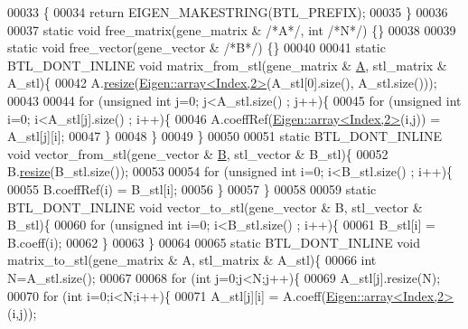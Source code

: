 \begin{DoxyCode}
00033   \{
00034     \textcolor{keywordflow}{return} EIGEN\_MAKESTRING(BTL\_PREFIX);
00035   \}
00036 
00037   \textcolor{keyword}{static} \textcolor{keywordtype}{void} free\_matrix(gene\_matrix & \textcolor{comment}{/*A*/}, \textcolor{keywordtype}{int} \textcolor{comment}{/*N*/}) \{\}
00038 
00039   \textcolor{keyword}{static} \textcolor{keywordtype}{void} free\_vector(gene\_vector & \textcolor{comment}{/*B*/}) \{\}
00040 
00041   \textcolor{keyword}{static} BTL\_DONT\_INLINE \textcolor{keywordtype}{void} matrix\_from\_stl(gene\_matrix & \hyperlink{group___core___module_class_eigen_1_1_matrix}{A}, stl\_matrix & A\_stl)\{
00042     A.\hyperlink{class_eigen_1_1_tensor_a5ab1ec6dc9b05d5e4db3600bc9d2cc6b}{resize}(\hyperlink{class_eigen_1_1array}{Eigen::array<Index,2>}(A\_stl[0].size(), A\_stl.size()));
00043 
00044     \textcolor{keywordflow}{for} (\textcolor{keywordtype}{unsigned} \textcolor{keywordtype}{int} j=0; j<A\_stl.size() ; j++)\{
00045       \textcolor{keywordflow}{for} (\textcolor{keywordtype}{unsigned} \textcolor{keywordtype}{int} i=0; i<A\_stl[j].size() ; i++)\{
00046         A.coeffRef(\hyperlink{class_eigen_1_1array}{Eigen::array<Index,2>}(i,j)) = A\_stl[j][i];
00047       \}
00048     \}
00049   \}
00050 
00051   \textcolor{keyword}{static} BTL\_DONT\_INLINE  \textcolor{keywordtype}{void} vector\_from\_stl(gene\_vector & \hyperlink{group___core___module_class_eigen_1_1_matrix}{B}, stl\_vector & B\_stl)\{
00052     B.\hyperlink{class_eigen_1_1_tensor_a5ab1ec6dc9b05d5e4db3600bc9d2cc6b}{resize}(B\_stl.size());
00053 
00054     \textcolor{keywordflow}{for} (\textcolor{keywordtype}{unsigned} \textcolor{keywordtype}{int} i=0; i<B\_stl.size() ; i++)\{
00055       B.coeffRef(i) = B\_stl[i];
00056     \}
00057   \}
00058 
00059   \textcolor{keyword}{static} BTL\_DONT\_INLINE  \textcolor{keywordtype}{void} vector\_to\_stl(gene\_vector & B, stl\_vector & B\_stl)\{
00060     \textcolor{keywordflow}{for} (\textcolor{keywordtype}{unsigned} \textcolor{keywordtype}{int} i=0; i<B\_stl.size() ; i++)\{
00061       B\_stl[i] = B.coeff(i);
00062     \}
00063   \}
00064 
00065   \textcolor{keyword}{static} BTL\_DONT\_INLINE  \textcolor{keywordtype}{void} matrix\_to\_stl(gene\_matrix & A, stl\_matrix & A\_stl)\{
00066     \textcolor{keywordtype}{int}  N=A\_stl.size();
00067 
00068     \textcolor{keywordflow}{for} (\textcolor{keywordtype}{int} j=0;j<N;j++)\{
00069       A\_stl[j].resize(N);
00070       \textcolor{keywordflow}{for} (\textcolor{keywordtype}{int} i=0;i<N;i++)\{
00071         A\_stl[j][i] = A.coeff(\hyperlink{class_eigen_1_1array}{Eigen::array<Index,2>}(i,j));

\end{DoxyCode}
